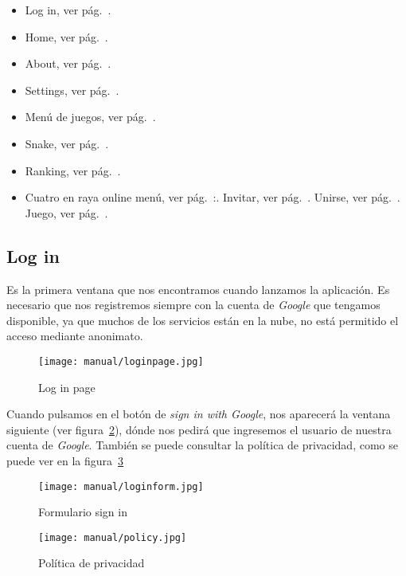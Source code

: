 \begin{itemize}
	\tightlist
	\item Log in, ver pág.~\pageref{login}.
	\item Home, ver pág.~\pageref{home}.
	\item About, ver pág.~\pageref{about}.
	\item Settings, ver pág.~\pageref{settings}.
	\item Menú de juegos, ver pág.~\pageref{menugames}.
	\item Snake, ver pág.~\pageref{snake}.
	\item Ranking, ver pág.~\pageref{rank}.
	\item Cuatro en raya online menú, ver pág.~\pageref{cuatromenu}:.
	\subitem Invitar, ver pág.~\pageref{cuatroinvitar}.
	\subitem Unirse, ver pág.~\pageref{cuatrounir}.
	\subitem Juego, ver pág.~\pageref{cuatrojuego}.
\end{itemize}

\subsection{Log in}\label{login}
Es la primera ventana que nos encontramos cuando lanzamos la aplicación. Es necesario que nos registremos siempre con la cuenta de \emph{Google} que tengamos disponible, ya que muchos de los servicios están en la nube, no está permitido el acceso mediante anonimato.

\begin{figure}[H]
	\centering
	\texttt{[image: manual/loginpage.jpg]}
	\caption{Log in page}\label{fig:loginpage}
\end{figure}

Cuando pulsamos en el botón de \emph{sign in with Google}, nos aparecerá la ventana siguiente (ver figura~\ref{fig:formlog}), dónde nos pedirá que ingresemos el usuario de nuestra cuenta de \emph{Google}. También se puede consultar la política de privacidad, como se puede ver en la figura~\ref{fig:policy}

\begin{figure}[H]
	\centering
	\texttt{[image: manual/loginform.jpg]}
	\caption{Formulario sign in}\label{fig:formlog}
\end{figure}

\begin{figure}[H]
	\centering
	\texttt{[image: manual/policy.jpg]}
	\caption{Política de privacidad}\label{fig:policy}
\end{figure}

